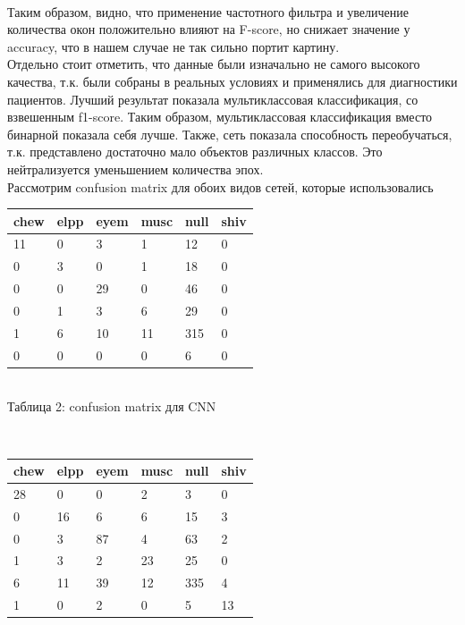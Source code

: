 \documentclass[12pt, a4paper, titlepage]{extreport}
\begin{document}
	\\
	Таким образом, видно, что применение частотного фильтра и увеличение количества окон положительно влияют на F-score, но снижает значение у accuracy, что в нашем случае не так сильно портит картину.\\
	Отдельно стоит отметить, что данные были изначально не самого высокого качества, т.к. были собраны в реальных условиях и применялись для диагностики пациентов. Лучший результат показала мультиклассовая классификация, со взвешенным f1-score. Таким образом, мультиклассовая классификация вместо бинарной показала себя лучше.
	Также, сеть показала способность переобучаться, т.к. представлено достаточно мало объектов различных классов. Это нейтрализуется уменьшением количества эпох.\\
	Рассмотрим confusion matrix для обоих видов сетей, которые использовались\\
	\begin{table}
		\begin{tabular}{|l|l|l|l| l| l|}
			\hline
			chew & elpp & eyem & musc & null & shiv  \\ \hline
			11   & 0    & 3    & 1    & 12   & 0     \\ \hline
			0    & 3    & 0    & 1    & 18   & 0     \\ \hline
			0    & 0    & 29   & 0    & 46   & 0     \\ \hline
			0    & 1    & 3    & 6    & 29   & 0     \\ \hline
			1    & 6    & 10   & 11   & 315  & 0     \\ \hline
			0    & 0    & 0    & 0    & 6    & 0    \\ \hline
		\end{tabular}\\
	Таблица 2: confusion matrix для CNN \\
	\end{table}	
	\\
		\begin{tabular}{|l|l|l|l| l| l|}
			\hline
				chew & elpp & eyem & musc & null & shiv   \\ \hline
				28&0&0&2&3&0 \\ \hline
				0&16&6&6&15&3 \\ \hline
				0&3&87&4&63&2 \\ \hline
				1&3&2&23&25&0 \\ \hline
				6&11&39&12&335&4 \\ \hline
				1&0&2&0&5&13 \\ \hline
		\end{tabular}\\
\end{document}
